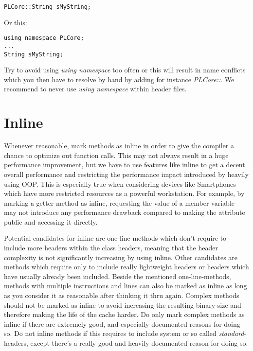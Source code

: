 \begin{lstlisting}[caption=Explicit namespace]
PLCore::String sMyString;
\end{lstlisting}

Or this:

\begin{lstlisting}[caption=Using namespace]
using namespace PLCore;
...
String sMyString;
\end{lstlisting}

Try to avoid using \emph{using namespace} too often or this will result in name conflicts which you then have to resolve by hand by adding for instance \emph{PLCore::}. We recommend to never use \emph{using namespace} within header files.




\section{Inline}
Whenever reasonable, mark methods as inline in order to give the compiler a chance to optimize out function calls. This may not always result in a huge performance improvement, but we have to use features like inline to get a decent overall performance and restricting the performance impact introduced by heavily using \ac{OOP}. This is especially true when considering devices like Smartphones which have more restricted resources as a powerful workstation. For example, by marking a getter-method as inline, requesting the value of a member variable may not introduce any performance drawback compared to making the attribute public and accessing it directly.

Potential candidates for inline are one-line-methods which don't require to include more headers within the class headers, meaning that the header complexity is not significantly increasing by using inline. Other candidates are methods which require only to include really lightweight headers or headers which have usually already been included. Beside the mentioned one-line-methods, methods with multiple instructions and lines can also be marked as inline as long as you consider it as reasonable after thinking it thru again. Complex methods should not be marked as inline to avoid increasing the resulting binary size and therefore making the life of the cache harder. Do only mark complex methods as inline if there are extremely good, and especially documented reasons for doing so. Do not inline methods if this requires to include system or so called \emph{standard}-headers, except there's a really good and heavily documented reason for doing so.

